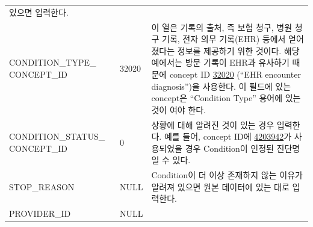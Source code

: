 \documentclass[10.5pt]{book}
\theoremstyle{definition}
\theoremstyle{definition}
\theoremstyle{definition}
\theoremstyle{remark}
\begin{document}
\begin{longtable}[]{@{}lll@{}}
\begin{minipage}[t]{0.48\columnwidth}
있으면 입력한다.\strut
\end{minipage}\tabularnewline
\begin{minipage}[t]{0.28\columnwidth}\raggedright\strut
CONDITION\_TYPE\_ CONCEPT\_ID\strut
\end{minipage} & \begin{minipage}[t]{0.16\columnwidth}\raggedright\strut
32020\strut
\end{minipage} & \begin{minipage}[t]{0.48\columnwidth}\raggedright\strut
이 열은 기록의 출처, 즉 보험 청구, 병원 청구 기록, 전자 의무 기록(EHR)
등에서 얻어졌다는 정보를 제공하기 위한 것이다. 해당 예에서는 방문 기록이
EHR과 유사하기 때문에 concept ID
\href{http://athena.ohdsi.org/search-terms/terms/32020}{32020} (``EHR
encounter diagnosis'')을 사용한다. 이 필드에 있는 concept은 ``Condition
Type'' 용어에 있는 것이 여야 한다.\strut
\end{minipage}\tabularnewline
\begin{minipage}[t]{0.28\columnwidth}\raggedright\strut
CONDITION\_STATUS\_ CONCEPT\_ID\strut
\end{minipage} & \begin{minipage}[t]{0.16\columnwidth}\raggedright\strut
0\strut
\end{minipage} & \begin{minipage}[t]{0.48\columnwidth}\raggedright\strut
상황에 대해 알려진 것이 있는 경우 입력한다. 예를 들어, concept ID에
\href{http://athena.ohdsi.org/search-terms/terms/4203942}{4203942}가
사용되었을 경우 Condition이 인정된 진단명일 수 있다.\strut
\end{minipage}\tabularnewline
\begin{minipage}[t]{0.28\columnwidth}\raggedright\strut
STOP\_REASON\strut
\end{minipage} & \begin{minipage}[t]{0.16\columnwidth}\raggedright\strut
NULL\strut
\end{minipage} & \begin{minipage}[t]{0.48\columnwidth}\raggedright\strut
Condition이 더 이상 존재하지 않는 이유가 알려져 있으면 원본 데이터에
있는 대로 입력한다.\strut
\end{minipage}\tabularnewline
\begin{minipage}[t]{0.28\columnwidth}\raggedright\strut
PROVIDER\_ID\strut
\end{minipage} & \begin{minipage}[t]{0.16\columnwidth}\raggedright\strut
NULL\strut
\end{minipage} & \begin{minipage}[t]{0.48\columnwidth}\raggedright\strut

\end{minipage}
\end{longtable}
\end{document}
